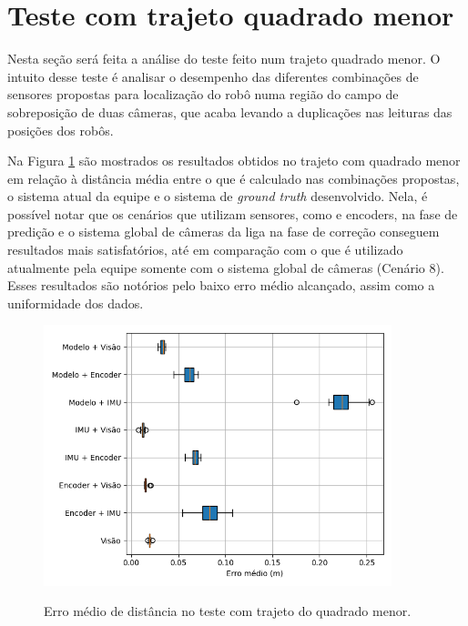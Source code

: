 \documentclass[acronym, symbols, table]{fei}
\begin{document}
	\section{Teste com trajeto quadrado menor} \label{sec:resultados_quadrado_menor}
	
	Nesta seção será feita a análise do teste feito num trajeto quadrado menor. O intuito desse teste é analisar o desempenho das diferentes combinações de sensores propostas para localização do robô numa região do campo de sobreposição de duas câmeras, que acaba levando a duplicações nas leituras das posições dos robôs.
	
	Na Figura \ref{fig:erro_medio_distancia_quad_menor} são mostrados os resultados obtidos no trajeto com quadrado menor em relação à distância média entre o que é calculado nas combinações propostas, o sistema atual da equipe e o sistema de \textit{ground truth} desenvolvido. Nela, é possível notar que os cenários que utilizam sensores, como  e encoders, na fase de predição e o sistema global de câmeras da liga na fase de correção conseguem resultados mais satisfatórios, até em comparação com o que é utilizado atualmente pela equipe somente com o sistema global de câmeras (Cenário 8). Esses resultados são notórios pelo baixo erro médio alcançado, assim como a uniformidade dos dados.
	
	\begin{figure}[!htb]
		\centering
		\caption{Erro médio de distância no teste com trajeto do quadrado menor.}
		\includegraphics[width=0.9\textwidth]{../Dados/Graficos-Resultados/erro_medio_distancia_quadrado_menor.png}
		\label{fig:erro_medio_distancia_quad_menor}
	\end{figure}
\end{document}
